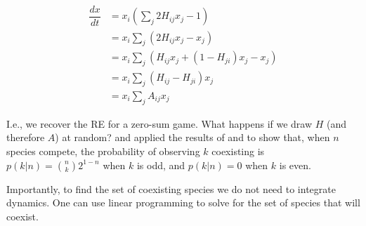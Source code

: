 \documentclass[]{book}
\newenvironment{Shaded}{\begin{snugshade}}{\end{snugshade}}
\newcommand{\CommentTok}[1]{\textcolor[rgb]{0.56,0.35,0.01}{\textit{#1}}}
\newcommand{\ControlFlowTok}[1]{\textcolor[rgb]{0.13,0.29,0.53}{\textbf{#1}}}
\newcommand{\DecValTok}[1]{\textcolor[rgb]{0.00,0.00,0.81}{#1}}
\newcommand{\KeywordTok}[1]{\textcolor[rgb]{0.13,0.29,0.53}{\textbf{#1}}}
\newcommand{\NormalTok}[1]{#1}
\newcommand{\OperatorTok}[1]{\textcolor[rgb]{0.81,0.36,0.00}{\textbf{#1}}}
\newcommand{\StringTok}[1]{\textcolor[rgb]{0.31,0.60,0.02}{#1}}
\begin{document}
\[
\begin{aligned}
  \dfrac{d x}{dt} &= x_i \left(\sum_j 2 H_{ij} x_j - 1 \right) \\
  &=x_i \sum_j (2 H_{ij} x_j - x_j) \\
  &= x_i \sum_j (H_{ij} x_j  + (1 - H_{ji}) x_j - x_j) \\
  &= x_i \sum_j (H_{ij} - H_{ji}) x_j \\
  &= x_i  \sum_j A_{ij} x_j
\end{aligned}
\]

I.e., we recover the RE for a zero-sum game. What happens if we draw \(H\) (and therefore \(A\)) at random? \citet{allesina2011competitive} and \citet{grilli2017higher} applied the results of \citet{fisher1995optimal} and \citet{brandl2017distribution} to show that, when \(n\) species compete, the probability of observing \(k\) coexisting is \(p(k|n) = \binom{n}{k} 2^{1-n}\) when \(k\) is odd, and \(p(k|n) = 0\) when \(k\) is even.

Importantly, to find the set of coexisting species we do not need to integrate dynamics. One can use linear programming to solve for the set of species that will coexist.

\begin{Shaded}
\end{Shaded}
\end{document}
